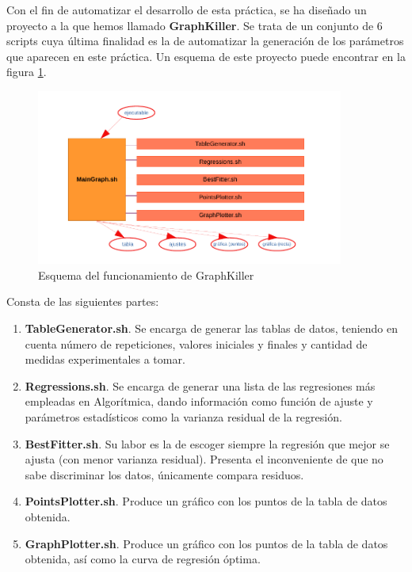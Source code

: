 \documentclass{homework}
\begin{document}
    Con el fin de automatizar el desarrollo de esta práctica, se ha diseñado un proyecto a la que hemos llamado 
    \textbf{GraphKiller}. Se trata de un conjunto de 6 scripts cuya última finalidad es la de automatizar la generación
    de los parámetros que aparecen en este práctica. Un esquema de este proyecto puede encontrar en la 
    figura \ref{graph-killer}. 

    \begin{figure}[H]
        \centering
        \includegraphics[width=0.9\textwidth]{img/esquema_graphkiller.pdf}
        \caption{Esquema del funcionamiento de GraphKiller}
        \label{graph-killer}
    \end{figure}

    Consta de las siguientes partes:

    \begin{enumerate}
        \item \textbf{TableGenerator.sh}. Se encarga de generar las tablas de datos, teniendo en cuenta número de repeticiones, valores iniciales y finales y cantidad de medidas experimentales a tomar.
        \item \textbf{Regressions.sh}. Se encarga de generar una lista de las regresiones más empleadas en Algorítmica, dando información como función de ajuste y parámetros estadísticos como la varianza residual de la regresión.
        \item \textbf{BestFitter.sh}. Su labor es la de escoger siempre la regresión que mejor se ajusta (con menor varianza residual). Presenta el inconveniente de que no sabe discriminar los datos, únicamente compara residuos.
        \item \textbf{PointsPlotter.sh}. Produce un gráfico con los puntos de la tabla de datos obtenida.
        \item \textbf{GraphPlotter.sh}. Produce un gráfico con los puntos de la tabla de datos obtenida, así como la curva de regresión óptima. 
    \end{enumerate}
\end{document}
